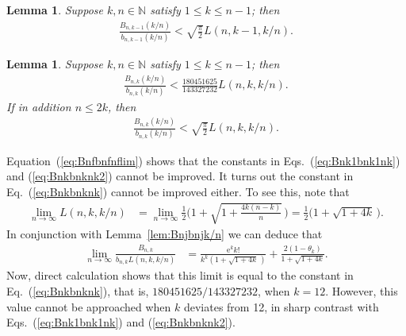 \documentclass[aop]{imsart}
\theoremstyle{plain}
\newtheorem{lemma}[theorem]{Lemma}
\theoremstyle{remark}
\newcommand{\rme}{\mathrm{e}}
\newcommand{\bbN}{\mathbb{N}}
\newcommand{\1}{\operatorname{\uppercase\expandafter{\romannumeral1}}}
\newcommand{\2}{\operatorname{\uppercase\expandafter{\romannumeral2}}}
\newcommand{\3}{\operatorname{\uppercase\expandafter{\romannumeral3}}}
\newcommand{\4}{\operatorname{\uppercase\expandafter{\romannumeral4}}}
\newcommand{\5}{\operatorname{\uppercase\expandafter{\romannumeral5}}}
\newcommand{\6}{\operatorname{\uppercase\expandafter{\romannumeral6}}}
\newcommand{\7}{\operatorname{\uppercase\expandafter{\romannumeral7}}}
\newcommand{\8}{\operatorname{\uppercase\expandafter{\romannumeral8}}}
\newcommand{\9}{\operatorname{\uppercase\expandafter{\romannumeral9}}}
\newcommand{\eref}[1]{Eq.~\textup{(\ref{#1})}}
\newcommand{\Eref}[1]{Equation~\textup{(\ref{#1})}}
\newcommand{\eqsref}[2]{Eqs.~(\ref{#1}) and (\ref{#2})}
\newcommand{\lref}[1]{Lemma~\ref{#1}}
\begin{document}
\begin{lemma}\label{lem:Bnk1bnk1nk}
	Suppose $k,n\in\bbN$  satisfy $1\leq k\leq n-1$; then
	\begin{gather}
	\frac{B_{n,k-1}(k/n)}{b_{n,k-1}(k/n)}< \sqrt{\frac{\pi}{2}}L(n,k-1,k/n). \label{eq:Bnk1bnk1nk}
	\end{gather}
\end{lemma}

\begin{lemma}\label{lem:Bnkbnknk}
	Suppose $k,n\in\bbN$  satisfy  $1\leq k\leq n-1$; then
	\begin{gather}
	\frac{B_{n,k}(k/n)}{b_{n,k}(k/n)}< \frac{180451625}{143327232} L(n,k,k/n). \label{eq:Bnkbnknk}
	\end{gather}
	If in addition $n\leq 2k$, then 
	\begin{gather}
	\frac{B_{n,k}(k/n)}{b_{n,k}(k/n)}< \sqrt{\frac{\pi}{2}}L(n,k,k/n). \label{eq:Bnkbnknk2}
	\end{gather}
\end{lemma}



\Eref{eq:Bnfbnfnflim} shows that the constants in \eqsref{eq:Bnk1bnk1nk}{eq:Bnkbnknk2} cannot be improved. It turns out the constant in \eref{eq:Bnkbnknk} cannot be improved either. To see this, note that
\begin{align}
\lim_{n\to\infty} L(n,k,k/n)&=\lim_{n\to\infty}\frac{1}{2}\biggl(1+\sqrt{1+\frac{4k(n-k)}{n}}\,\biggr)=\frac{1}{2}\bigl(1+\sqrt{1+4k}\,\bigr).
\end{align}
In conjunction with \lref{lem:Bnjbnjk/n} we can deduce that 
\begin{align}
\lim_{n\to\infty}\frac{B_{n,k}}{b_{n,k}L(n,k,k/n)}&= \frac{\rme^k k!}{k^k (1+\sqrt{1+4k}\,)}+\frac{2(1-\theta_k)}{1+\sqrt{1+4k}}. \label{eq:BnkbnkLlim}
\end{align}
Now, direct calculation shows that this limit is equal to the constant in \eref{eq:Bnkbnknk}, that is, $180451625/143327232$, when $k=12$. However, this value cannot be approached when $k$ deviates from 12, in sharp contrast with \eqsref{eq:Bnk1bnk1nk}{eq:Bnkbnknk2}.
\end{document}

